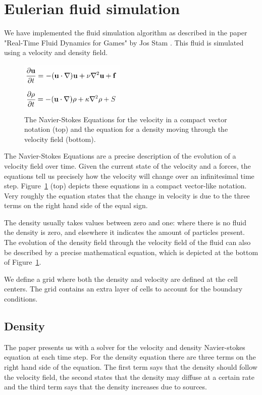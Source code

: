 \section{Eulerian fluid simulation}

We have implemented the fluid simulation algorithm as described in the paper "Real-Time Fluid Dynamics for Games" by Jos Stam \cite{stable}.
This fluid is simulated using a velocity and density field.

\begin{figure}[h]
    \centering
    \includegraphics[width=5cm]{img/navierstokes.png}
    \caption{The Navier-Stokes Equations for the velocity in a compact vector notation (top) and the equation for a density moving through the velocity field (bottom).}
    \label{fig:navierstokes}
\end{figure}

\noindent The Navier-Stokes Equations are a precise description of the evolution of a velocity field over time.
Given the current state of the velocity and a forces, the equations tell us precisely how the velocity will change over an infinitesimal time step.
Figure~\ref{fig:navierstokes} (top) depicts these equations in a compact vector-like notation.
Very roughly the equation states that the change in velocity is due to the three terms on the right hand side of the equal sign.

\noindent The density usually takes values between zero and one: where there is no fluid the density is zero, and elsewhere it indicates the amount of particles present.
The evolution of the density field through the velocity field of the fluid can also be described by a precise mathematical equation,
which is depicted at the bottom of Figure~\ref{fig:navierstokes}.

\noindent We define a grid where both the density and velocity are defined at the cell centers.
The grid contains an extra layer of cells to account for the boundary conditions.

\subsection{Density}
The paper presents us with a solver for the velocity and density Navier-stokes equation at each time step.
For the density equation there are three terms on the right hand side of the equation.
The first term says that the density should follow the velocity field, the second states that the density may diffuse at a certain rate and the third term says that the density increases due to sources.

